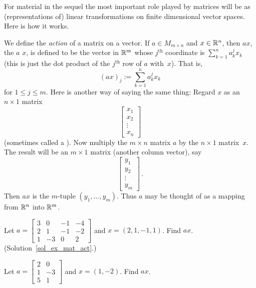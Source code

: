 For material in the sequel the most important role played by matrices will be as
(representations of) linear transformations on finite dimensional vector spaces. Here is how
it works.

\begin{defn}\label{def_act_matr} We define the \emph{action} of a matrix on a vector.  If
$a \in M_{m \times n}$ and $x \in \mathbb{R}^n$, then $ax$, the
 $a$  $x$, is defined to be the vector in $\mathbb{R}^m$ whose
$j^{\text{th}}$ coordinate is $\sum_{k=1}^n a_k^j x_k$ (this is just the dot product of the
$j^{\text{th}}$ row of $a$ with~$x$).  That is,
  \[ (ax)_j := \sum_{k=1}^n a_k^jx_k \]
for $1 \le j \le m$.  Here is another way of saying the same thing: Regard $x$ as an $n \times
1$ matrix
  \[ \begin{bmatrix} x_1 \\ x_2 \\ \vdots \\ x_n \end{bmatrix} \]
(sometimes called a
).  Now multiply the $m \times n$ matrix $a$ by the $n \times 1$ matrix~$x$.
The result will be an $m \times 1$ matrix (another column vector), say
  \[ \begin{bmatrix} y_1 \\ y_2 \\ \vdots \\ y_m \end{bmatrix}\,. \]
Then
$ax$ is the $m$-tuple $(y_1,\dots, y_m)$.  Thus $a$ may be thought of as a mapping from $\mathbb{R}^n$
into $\mathbb{R}^m$.
\end{defn}

\begin{exer}\label{ex_mat_act} Let $a =
        \begin{bmatrix}
             3 &  0 & -1 & -4 \\
             2 &  1 & -1 & -2 \\
             1 & -3 &  0 &  2
        \end{bmatrix}$ and $x = (2, 1, -1, 1)$.  Find $ax$.  (Solution~\ref{sol_ex_mat_act}.)
\end{exer}

\begin{prob}  Let $a = \begin{bmatrix}
                            2 &  0 \\
                            1 & -3 \\
                            5 &  1
                       \end{bmatrix}$
and $x = (1,-2)$.  Find $ax$.
\end{prob}

